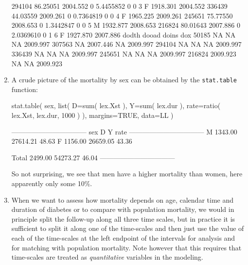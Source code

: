 \begin{enumerate}
\begin{Schunk}
\begin{Soutput}
294104 86.25051 2004.552   0  5.4455852       0       0      3   F 1918.301 2004.552
336439 44.03559 2009.261   0  0.7364819       0       0      4   F 1965.225 2009.261
245651 75.77550 2008.653   0  1.3442847       0       0      5   M 1932.877 2008.653
216824 80.01643 2007.886   0  2.0369610       0       1      6   F 1927.870 2007.886
          dodth    dooad doins      dox
50185        NA       NA    NA 2009.997
307563       NA 2007.446    NA 2009.997
294104       NA       NA    NA 2009.997
336439       NA       NA    NA 2009.997
245651       NA       NA    NA 2009.997
216824 2009.923       NA    NA 2009.923
\end{Soutput}
\end{Schunk}


\item A crude picture of the mortality by sex can be obtained by
  the \texttt{stat.table} function:
\begin{Schunk}
\begin{Sinput}
 stat.table( sex,
             list( D=sum( lex.Xst ),
                   Y=sum( lex.dur ),
                rate=ratio( lex.Xst, lex.dur, 1000 ) ),
             margins=TRUE,
             data=LL )
\end{Sinput}
\begin{Soutput}
 --------------------------------- 
 sex           D        Y    rate  
 --------------------------------- 
 M       1343.00 27614.21   48.63  
 F       1156.00 26659.05   43.36  
                                   
 Total   2499.00 54273.27   46.04  
 --------------------------------- 
\end{Soutput}
\end{Schunk}
  So not surprising, we see that men have a higher mortality than
  women, here apparently only some 10\%.

  
\item When we want to assess how mortality depends on age, calendar
  time and duration of diabetes or to compare with population
  mortality, we would in principle split the follow-up along all three
  time scales, but in practice it is sufficient to split it along one
  of the time-scales and then just use the value of each of the
  time-scales at the left endpoint of the intervals for analysis and
  for matching with population mortality. Note however that this
  requires that time-scales are treated as \emph{quantitative}
  variables in the modeling.


\end{enumerate}
